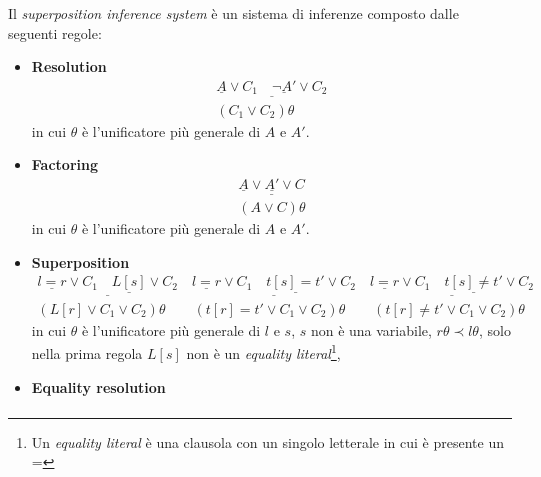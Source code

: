 \begin{definition}\label{supdef}
    Il \emph{superposition inference system} è un sistema di inferenze composto dalle seguenti regole:
    \begin{itemize}
        \item \textbf{Resolution}
        \begin{equation}\label{res-eq}
            \begin{gathered}
                \underline{\underline{A} \lor C_1 \quad\underline{\lnot A'}\lor C_2}\\
                (C_1 \lor C_2)\theta
            \end{gathered}
        \end{equation}
        in cui $\theta$ è l'unificatore più generale di $A$ e $A'$.
        \item \textbf{Factoring}\label{fact-eq}
        \begin{equation}
            \begin{gathered}
                \underline{\underline{A} \lor \underline{A'} \lor C}\\
                (A \lor C)\theta
            \end{gathered}
        \end{equation}
        in cui $\theta$ è l'unificatore più generale di $A$ e $A'$.
        \item \textbf{Superposition}
        \begin{equation}
            \begin{gathered}
                \underline{\underline{l=r} \lor C_1 \quad \underline{L[s]}\lor C_2} \quad \underline{\underline{l=r} \lor C_1 \quad \underline{t[s]=t'}\lor C_2} \quad \underline{\underline{l=r} \lor C_1 \quad \underline{t[s]\neq t'}\lor C_2}\\
                (L[r] \lor C_1 \lor C_2)\theta \qquad (t[r]=t' \lor C_1 \lor C_2)\theta \qquad (t[r]\neq t' \lor C_1 \lor C_2)\theta
            \end{gathered}
        \end{equation}
        in cui $\theta$ è l'unificatore più generale di $l$ e $s$, $s$ non è una variabile, 
        $r\theta\prec l\theta$, solo nella prima regola $L[s]$ non è un \emph{equality literal}\footnote{Un \emph{equality literal} è una clausola 
        con un singolo letterale in cui è presente un =},
        \item \textbf{Equality resolution}
        \begin{equation}
            \begin{gathered}

\end{gathered}
\end{equation}
\end{itemize}
\end{definition}
